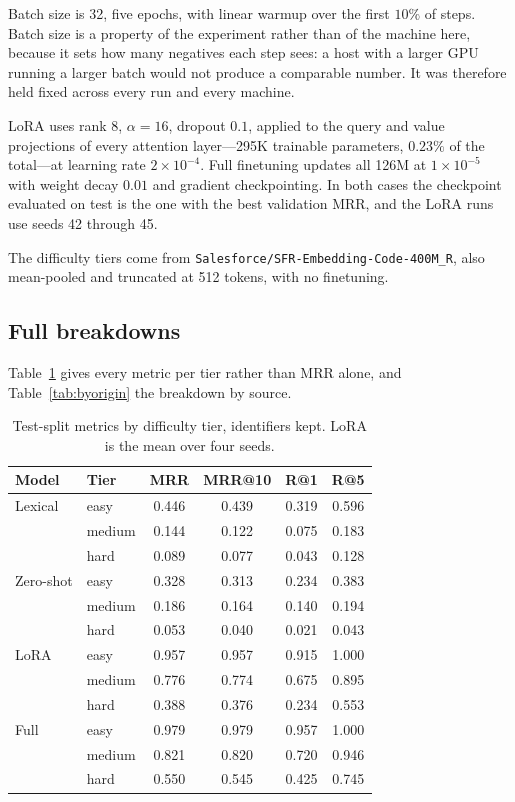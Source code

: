 Batch size is 32, five epochs, with linear warmup over the first $10\%$ of
steps. Batch size is a property of the experiment rather than of the machine
here, because it sets how many negatives each step sees: a host with a larger
GPU running a larger batch would not produce a comparable number. It was
therefore held fixed across every run and every machine.

LoRA uses rank 8, $\alpha=16$, dropout $0.1$, applied to the query and value
projections of every attention layer---295K trainable parameters, $0.23\%$ of
the total---at learning rate $2 \times 10^{-4}$. Full finetuning updates all
126M at $1 \times 10^{-5}$ with weight decay $0.01$ and gradient
checkpointing. In both cases the checkpoint evaluated on test is the one with
the best validation MRR, and the LoRA runs use seeds 42 through 45.

The difficulty tiers come from \texttt{Salesforce/SFR-Em\-bedding-Code-400M\_R},
also mean-pooled and truncated at 512 tokens, with no finetuning.

\subsection{Full breakdowns}

Table~\ref{tab:bytierfull} gives every metric per tier rather than MRR alone,
and Table~\ref{tab:byorigin} the breakdown by source.

\begin{table}[tbp]
\caption{Test-split metrics by difficulty tier, identifiers kept. LoRA is the
mean over four seeds.}
\label{tab:bytierfull}
\centering
\footnotesize
\begin{tabular}{llcccc}
\toprule
Model & Tier & MRR & MRR@10 & R@1 & R@5 \\
\midrule
Lexical      & easy   & 0.446 & 0.439 & 0.319 & 0.596 \\
             & medium & 0.144 & 0.122 & 0.075 & 0.183 \\
             & hard   & 0.089 & 0.077 & 0.043 & 0.128 \\
\midrule
Zero-shot    & easy   & 0.328 & 0.313 & 0.234 & 0.383 \\
             & medium & 0.186 & 0.164 & 0.140 & 0.194 \\
             & hard   & 0.053 & 0.040 & 0.021 & 0.043 \\
\midrule
LoRA         & easy   & 0.957 & 0.957 & 0.915 & 1.000 \\
             & medium & 0.776 & 0.774 & 0.675 & 0.895 \\
             & hard   & 0.388 & 0.376 & 0.234 & 0.553 \\
\midrule
Full         & easy   & 0.979 & 0.979 & 0.957 & 1.000 \\
             & medium & 0.821 & 0.820 & 0.720 & 0.946 \\
             & hard   & 0.550 & 0.545 & 0.425 & 0.745 \\
\bottomrule
\end{tabular}
\end{table}

